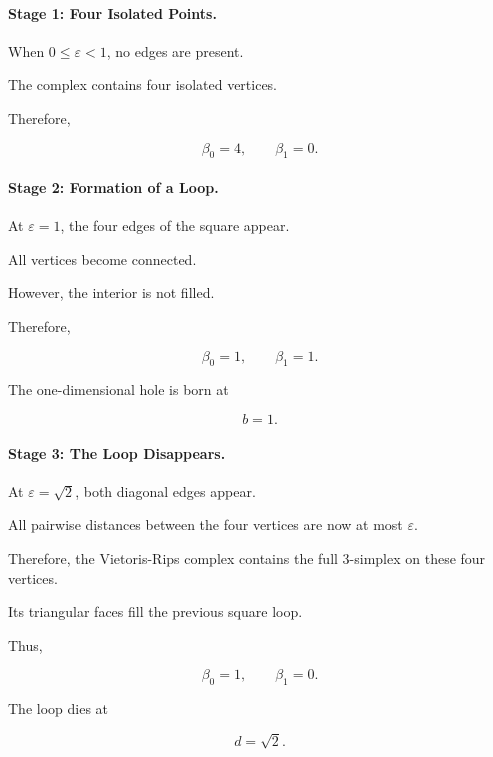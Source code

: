 \documentclass[oneside,english,11pt]{article}
\begin{document}
\paragraph{Stage 1: Four Isolated Points.}

When $0\leq\varepsilon<1$, no edges
are present.

The complex contains four isolated
vertices.

Therefore,

\begin{equation}
\beta_0=4,\qquad\beta_1=0.
\end{equation}


\paragraph{Stage 2: Formation of a Loop.}

At $\varepsilon=1$, the four edges
of the square appear.

All vertices become connected.

However, the interior is not filled.

Therefore,

\begin{equation}
\beta_0=1,\qquad\beta_1=1.
\end{equation}

The one-dimensional hole is born at

\begin{equation}
b=1.
\end{equation}


\paragraph{Stage 3: The Loop Disappears.}

At $\varepsilon=\sqrt{2}$, both
diagonal edges appear.

All pairwise distances between the
four vertices are now at most
$\varepsilon$.

Therefore, the Vietoris-Rips
complex contains the full 3-simplex
on these four vertices.

Its triangular faces fill the
previous square loop.

Thus,

\begin{equation}
\beta_0=1,\qquad\beta_1=0.
\end{equation}

The loop dies at

\begin{equation}
d=\sqrt{2}.
\end{equation}
\end{document}
